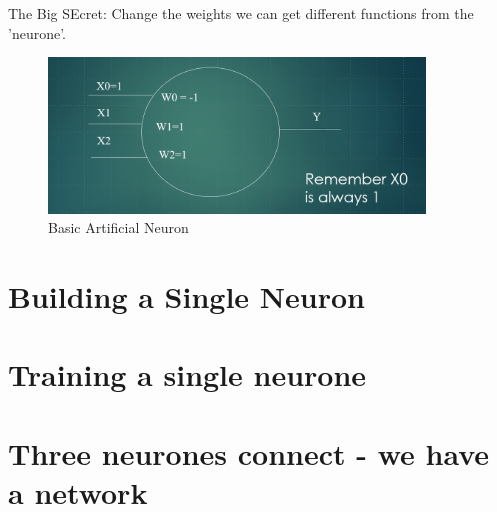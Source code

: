 The Big SEcret: Change the weights we can get different functions from the 'neurone'.

\begin{figure}
    \centering
    \includegraphics[width=10cm]{chapters/chAi1/figures/overall neurone2.png}
    \caption{Basic Artificial Neuron}
    \label{fig:basicneuron}
\end{figure}

\section{Building a Single Neuron}

\section{Training a single neurone}

\section{Three neurones connect - we have a network}